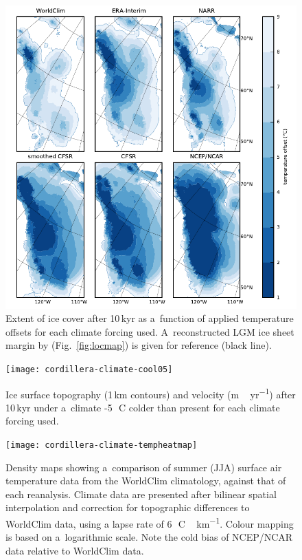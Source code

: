 \documentclass[tc, ms]{copernicus}
\begin{document}
\begin{figure}
  \includegraphics{cordillera-climate-extent}
  \caption{Extent of ice cover after 10\,kyr as a~function of applied temperature offsets for each climate forcing used. A~reconstructed LGM ice sheet margin by \citet{dyke-2004} (Fig.~\ref{fig:locmap}) is given for reference (black line).}
  \label{fig:extent}
\end{figure}

\begin{figure}
  \texttt{[image: cordillera-climate-cool05]}
  \caption{Ice surface topography (1\,\unit{km} contours) and velocity (\unit{m\,yr^{-1}}) after 10\,kyr under a~climate -5\,\unit{{\degree}C} colder than present for each climate forcing used.}
  \label{fig:cool05}
\end{figure}

\begin{figure}
  \texttt{[image: cordillera-climate-tempheatmap]}
  \caption{Density maps showing a~comparison of summer (JJA) surface air temperature data from the WorldClim climatology, against that of each reanalysis. Climate data are presented after bilinear spatial interpolation and correction for topographic differences to WorldClim data, using a lapse rate of 6\,\unit{{\degree}C\,km^{-1}}. Colour mapping is based on a~logarithmic scale. Note the cold bias of NCEP/NCAR data relative to WorldClim data.}
  \label{fig:tempheatmap}
\end{figure}
\end{document}
